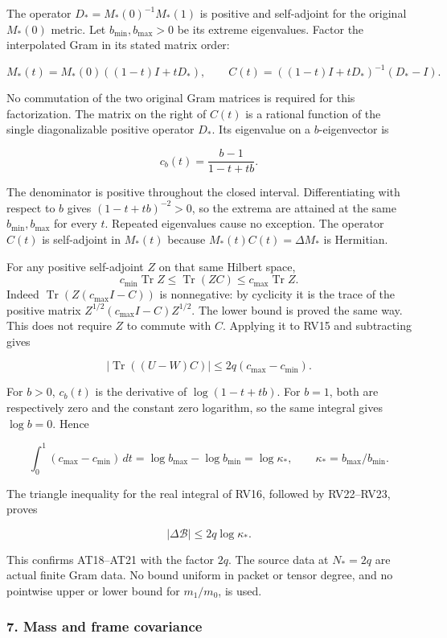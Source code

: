 The operator \(D_*=M_*(0)^{-1}M_*(1)\) is positive and self-adjoint for the original \(M_*(0)\) metric. Let \(b_{\min},b_{\max}>0\) be its extreme eigenvalues. Factor the interpolated Gram in its stated matrix order:

\[
M_*(t)=M_*(0)((1-t)I+tD_*),\qquad
C(t)=((1-t)I+tD_*)^{-1}(D_*-I).
\tag{RV20}
\]

No commutation of the two original Gram matrices is required for this factorization. The matrix on the right of \(C(t)\) is a rational function of the single diagonalizable positive operator \(D_*\). Its eigenvalue on a \(b\)-eigenvector is

\[
c_b(t)=\frac{b-1}{1-t+tb}.
\tag{RV21}
\]

The denominator is positive throughout the closed interval. Differentiating with respect to \(b\) gives \((1-t+tb)^{-2}>0\), so the extrema are attained at the same \(b_{\min},b_{\max}\) for every \(t\). Repeated eigenvalues cause no exception. The operator \(C(t)\) is self-adjoint in \(M_*(t)\) because \(M_*(t)C(t)=\Delta M_*\) is Hermitian.

For any positive self-adjoint \(Z\) on that same Hilbert space, \[
c_{\min}\operatorname{Tr}Z
\le\operatorname{Tr}(ZC)
\le c_{\max}\operatorname{Tr}Z.
\] Indeed \(\operatorname{Tr}(Z(c_{\max}I-C))\) is nonnegative: by cyclicity it is the trace of the positive matrix \(Z^{1/2}(c_{\max}I-C)Z^{1/2}\). The lower bound is proved the same way. This does not require \(Z\) to commute with \(C\). Applying it to RV15 and subtracting gives

\[
|\operatorname{Tr}((U-W)C)|
\le2q(c_{\max}-c_{\min}).
\tag{RV22}
\]

For \(b>0\), \(c_b(t)\) is the derivative of \(\log(1-t+tb)\). For \(b=1\), both are respectively zero and the constant zero logarithm, so the same integral gives \(\log b=0\). Hence

\[
\int_0^1(c_{\max}-c_{\min})\,dt
=\log b_{\max}-\log b_{\min}
=\log\kappa_*,\qquad \kappa_*=b_{\max}/b_{\min}.
\tag{RV23}
\]

The triangle inequality for the real integral of RV16, followed by RV22--RV23, proves

\[
|\Delta\mathcal B|\le2q\log\kappa_*.
\tag{RV24}
\]

This confirms AT18--AT21 with the factor \(2q\). The source data at \(N_*=2q\) are actual finite Gram data. No bound uniform in packet or tensor degree, and no pointwise upper or lower bound for \(m_1/m_0\), is used.

\subsubsection{7. Mass and frame covariance}\label{endpoint-determinant_review--mass-and-frame-covariance}

